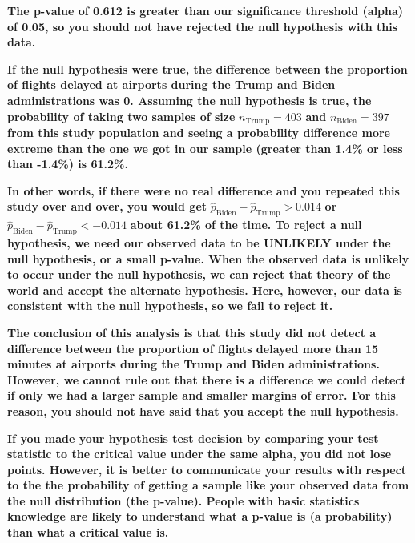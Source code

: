 \documentclass[
  letterpaper,
  DIV=11,
  numbers=noendperiod]{scrartcl}
\begin{document}
\begin{tcolorbox}[enhanced jigsaw, colback=white, breakable, arc=.35mm, left=2mm, colframe=quarto-callout-warning-color-frame, opacityback=0, rightrule=.15mm, toprule=.15mm, bottomrule=.15mm, leftrule=.75mm]

\textbf{The p-value of 0.612 is greater than our significance threshold
(alpha) of 0.05, so you should not have rejected the null hypothesis
with this data.}

\textbf{If the null hypothesis were true, the difference between the
proportion of flights delayed at airports during the Trump and Biden
administrations was 0. Assuming the null hypothesis is true, the
probability of taking two samples of size} \(n_{\text{Trump}}=403\)
\textbf{and} \(n_{\text{Biden}}=397\) \textbf{from this study population
and seeing a probability difference more extreme than the one we got in
our sample (greater than 1.4\% or less than -1.4\%) is 61.2\%.}

\textbf{In other words, if there were no real difference and you
repeated this study over and over, you would get}
\(\hat{p}_{\text{Biden}}-\hat{p}_{\text{Trump}}>0.014\) \textbf{or}
\(\hat{p}_{\text{Biden}}-\hat{p}_{\text{Trump}}<-0.014\) \textbf{about
61.2\% of the time. To reject a null hypothesis, we need our observed
data to be UNLIKELY under the null hypothesis, or a small p-value. When
the observed data is unlikely to occur under the null hypothesis, we can
reject that theory of the world and accept the alternate hypothesis.
Here, however, our data is consistent with the null hypothesis, so we
fail to reject it.}

\textbf{The conclusion of this analysis is that this study did not
detect a difference between the proportion of flights delayed more than
15 minutes at airports during the Trump and Biden administrations.
However, we cannot rule out that there is a difference we could detect
if only we had a larger sample and smaller margins of error. For this
reason, you should not have said that you accept the null hypothesis.}

\textbf{If you made your hypothesis test decision by comparing your test
statistic to the critical value under the same alpha, you did not lose
points. However, it is better to communicate your results with respect
to the the probability of getting a sample like your observed data from
the null distribution (the p-value). People with basic statistics
knowledge are likely to understand what a p-value is (a probability)
than what a critical value is.}

\end{tcolorbox}
\end{document}
